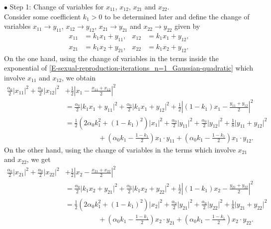\documentclass[reqno]{amsart}
\numberwithin{equation}{section}
\begin{document}
{\medskip

$\bullet$ {\sc Step 1:} Change of variables for $x_{11}$, $x_{12}$, $x_{21}$ and $x_{22}$.\\
Consider some coefficient $k_1>0$ to be determined later and define the change of variables $x_{11}\rightarrow y_{11}$, $x_{12}\rightarrow y_{12}$, $x_{21}\rightarrow y_{21}$ and $x_{22}\rightarrow y_{22}$ given by
\begin{align*}
x_{11}&=k_1x_1+y_{11}, & x_{12}&=k_1x_1+y_{12},\\
x_{21}&=k_1x_2+y_{21}, & x_{22}&=k_1x_2+y_{12}.
\end{align*}
On the one hand, using the change of variables in the terms inside the exponential of \eqref{E-sexual-reproduction-iterations_n=1_Gaussian-quadratic} which involve $x_{11}$ and $x_{12}$, we obtain
\begin{align*}
\frac{\alpha_0}{2}\vert x_{11}\vert^2+\frac{\alpha_0}{2}\vert x_{12}\vert^2&+\frac{1}{2}\left\vert x_1-\frac{x_{11}+x_{12}}{2}\right\vert^2\\
&=\frac{\alpha_0}{2}\vert k_1x_1+y_{11}\vert^2+\frac{\alpha_0}{2}\vert k_1 x_1+y_{12}\vert^2+\frac{1}{2}\left\vert (1-k_1)x_1-\frac{y_{11}+y_{12}}{2}\right\vert^2\\
&=\frac{1}{2}\left(2\alpha_0 k_1^2+(1-k_1)^2\right)\vert x_1\vert^2+\frac{\alpha_0}{2}\vert y_{11}\vert^2+\frac{\alpha_0}{2}\vert y_{12}\vert^2+\frac{1}{8}\vert y_{11}+y_{12}\vert^2\\
&\hspace{2cm} +\left(\alpha_0 k_1-\frac{1-k_1}{2}\right)x_1\cdot y_{11}+\left(\alpha_0 k_1-\frac{1-k_1}{2}\right)x_1\cdot y_{12}.
\end{align*}
On the other hand, using the change of variables in the terms which involve $x_{21}$ and $x_{22}$, we get
\begin{align*}
\frac{\alpha_0}{2}\vert x_{21}\vert^2+\frac{\alpha_0}{2}\vert x_{22}\vert^2&+\frac{1}{2}\left\vert x_2-\frac{x_{21}+x_{22}}{2}\right\vert^2\\
&=\frac{\alpha_0}{2}\vert k_1x_2+y_{21}\vert^2+\frac{\alpha_0}{2}\vert k_1 x_2+y_{22}\vert^2+\frac{1}{2}\left\vert (1-k_1)x_2-\frac{y_{21}+y_{22}}{2}\right\vert^2\\
&=\frac{1}{2}\left(2\alpha_0 k_1^2+(1-k_1)^2\right)\vert x_2\vert^2+\frac{\alpha_0}{2}\vert y_{21}\vert^2+\frac{\alpha_0}{2}\vert y_{22}\vert^2+\frac{1}{8}\vert y_{21}+y_{22}\vert^2\\
&\hspace{2cm} +\left(\alpha_0 k_1-\frac{1-k_1}{2}\right)x_2\cdot y_{21}+\left(\alpha_0 k_1-\frac{1-k_1}{2}\right)x_2\cdot y_{22}.

\end{align*}}
\end{document}
